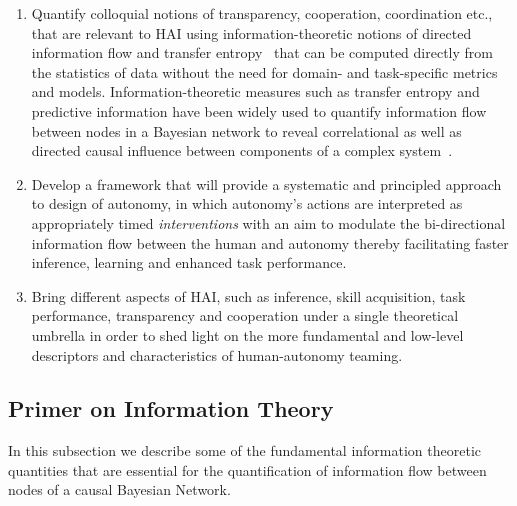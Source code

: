 \documentclass[12pt]{article}
\begin{document}
\begin{enumerate}
	\item Quantify colloquial notions of transparency, cooperation, coordination etc., that are relevant to HAI using information-theoretic notions of directed information flow and transfer entropy~\cite{schreiber2000measuring} that can be computed directly from the statistics of data without the need for domain- and task-specific metrics and models. Information-theoretic measures such as transfer entropy and predictive information have been widely used to quantify information flow between nodes in a Bayesian network to reveal correlational as well as directed causal influence between components of a complex system~\cite{ay2008information}. 
	
	\item Develop a framework that will provide a systematic and principled approach to design of autonomy, in which autonomy's actions are interpreted as appropriately timed \textit{interventions} with an aim to modulate the bi-directional information flow between the human and autonomy thereby facilitating faster inference, learning and enhanced task performance.
	
	\item Bring different aspects of HAI, such as inference, skill acquisition, task performance, transparency and cooperation under a single theoretical umbrella in order to shed light on the more fundamental and low-level descriptors and characteristics of human-autonomy teaming. 
\end{enumerate}

%
%
%
\subsection{Primer on Information Theory}
In this subsection we describe some of the fundamental information theoretic quantities that are essential for the quantification of information flow between nodes of a causal Bayesian Network. 
\end{document}
